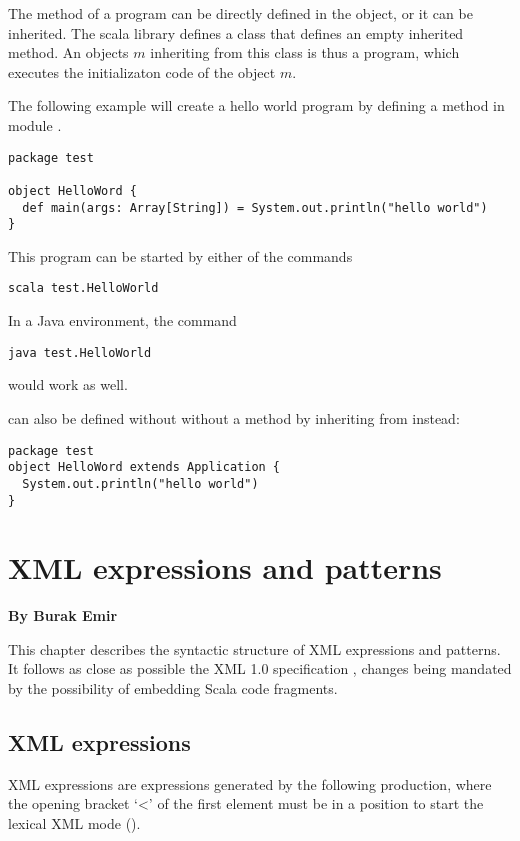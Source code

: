 The  method of a program can be directly defined in the
object, or it can be inherited. The scala library defines a class
 that defines an empty inherited  method.
An objects $m$ inheriting from this class is thus a program, 
which executes the initializaton code of the object $m$.

\example The following example will create a hello world program by defining
a method  in module .
\begin{lstlisting}
package test 

object HelloWord {
  def main(args: Array[String]) = System.out.println("hello world")
}
\end{lstlisting}

This program can be started by either of the commands
\begin{lstlisting}
scala test.HelloWorld
\end{lstlisting}
In a Java environment, the command
\begin{lstlisting}
java test.HelloWorld
\end{lstlisting}
would work as well. 

 can also be defined without without a  method 
by inheriting from  instead:
\begin{lstlisting}
package test 
object HelloWord extends Application {
  System.out.println("hello world")
}
\end{lstlisting}

\chapter{XML expressions and patterns}

{\bf By Burak Emir}\bigskip\bigskip


This chapter describes the syntactic structure of XML expressions and patterns.
It follows as close as possible the XML 1.0 specification \cite{w3c:xml},
changes being mandated by the possibility of embedding Scala code fragments.

\section{XML expressions}
XML expressions are expressions generated by the following production, where the 
opening bracket `<' of the first element must be in a position to start the lexical
XML mode ().

